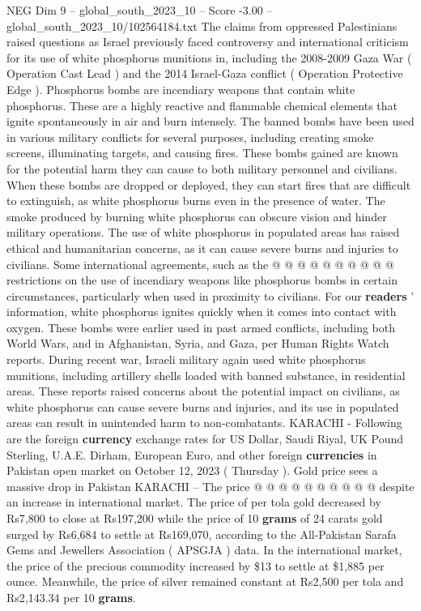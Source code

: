 \begin{textsample}{NEG Dim 9 – global\_south\_2023\_10 – Score -3.00 – global\_south\_2023\_10/102564184.txt}  \label{ex:f9_neg_417}
The claims from oppressed Palestinians raised questions as Israel previously faced controversy and international criticism for its use of white phosphorus munitions in, including the 2008-2009 Gaza War ( Operation Cast Lead ) and the 2014 Israel-Gaza conflict ( Operation Protective Edge ).
Phosphorus bombs are incendiary weapons that contain white phosphorus.
These are a highly reactive and flammable chemical elements that ignite spontaneously in air and burn intensely.
The banned bombs have been used in various military conflicts for several purposes, including creating smoke screens, illuminating targets, and causing fires.
These bombs gained are known for the potential harm they can cause to both military personnel and civilians.
When these bombs are dropped or deployed, they can start fires that are difficult to extinguish, as white phosphorus burns even in the presence of water.
The smoke produced by burning white phosphorus can obscure vision and hinder military operations.
The use of white phosphorus in populated areas has raised ethical and humanitarian concerns, as it can cause severe burns and injuries to civilians.
Some international agreements, such as the @ @ @ @ @ @ @ @ @ @ restrictions on the use of incendiary weapons like phosphorus bombs in certain circumstances, particularly when used in proximity to civilians.
For our \textbf{readers} ' information, white phosphorus ignites quickly when it comes into contact with oxygen.
These bombs were earlier used in past armed conflicts, including both World Wars, and in Afghanistan, Syria, and Gaza, per Human Rights Watch reports.
During recent war, Israeli military again used white phosphorus munitions, including artillery shells loaded with banned substance, in residential areas.
These reports raised concerns about the potential impact on civilians, as white phosphorus can cause severe burns and injuries, and its use in populated areas can result in unintended harm to non-combatants.
KARACHI - Following are the foreign \textbf{currency} exchange rates for US Dollar, Saudi Riyal, UK Pound Sterling, U.A.E.
Dirham, European Euro, and other foreign \textbf{currencies} in Pakistan open market on October 12, 2023 ( Thursday ).
Gold price sees a massive drop in Pakistan KARACHI -- The price @ @ @ @ @ @ @ @ @ @ despite an increase in international market.
The price of per tola gold decreased by Rs7,800 to close at Rs197,200 while the price of 10 \textbf{grams} of 24 carats gold surged by Rs6,684 to settle at Rs169,070, according to the All-Pakistan Sarafa Gems and Jewellers Association ( APSGJA ) data.
In the international market, the price of the precious commodity increased by \$13 to settle at \$1,885 per ounce.
Meanwhile, the price of silver remained constant at Rs2,500 per tola and Rs2,143.34 per 10 \textbf{grams}.

\end{textsample}
